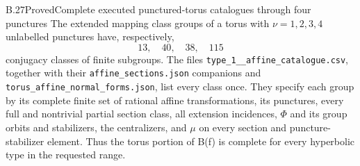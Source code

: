 \begin{claim}{B.27}{Proved}{Complete executed punctured-torus catalogues through four punctures}
The extended mapping class groups of a torus with $\nu=1,2,3,4$
unlabelled punctures have, respectively,
\[
                         13,\quad40,\quad38,\quad115
\]
conjugacy classes of finite subgroups.  The files
\texttt{type\_1\_\nu\_affine\_catalogue.csv}, together with their
\texttt{affine\_sections.json} companions and
\texttt{torus\_affine\_normal\_forms.json}, list every class once.
They specify each group by its complete finite set of rational affine
transformations, its punctures, every full and nontrivial partial section
class, all extension incidences, $\Phi$ and its group orbits and stabilizers,
the centralizers, and $\mu$ on every section and puncture-stabilizer element.
Thus the torus portion of B(f) is complete for every hyperbolic type in the
requested range.
\end{claim}

